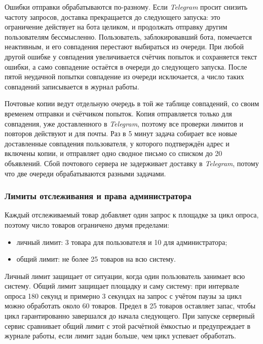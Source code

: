 Ошибки отправки обрабатываются по-разному. Если \textit{Telegram} просит снизить частоту запросов, доставка прекращается до следующего запуска: это ограничение действует на бота целиком, и продолжать отправку другим пользователям бессмысленно. Пользователь, заблокировавший бота, помечается неактивным, и его совпадения перестают выбираться из очереди. При любой другой ошибке у совпадения увеличивается счётчик попыток и сохраняется текст ошибки, а само совпадение остаётся в очереди до следующего запуска. После пятой неудачной попытки совпадение из очереди исключается, а число таких совпадений записывается в журнал работы.

Почтовые копии ведут отдельную очередь в той же таблице совпадений, со своим временем отправки и счётчиком попыток. Копия отправляется только для совпадения, уже доставленного в \textit{Telegram}, поэтому все проверки лимитов и повторов действуют и для почты. Раз в 5 минут задача собирает все новые доставленные совпадения пользователя, у которого подтверждён адрес и включены копии, и отправляет одно сводное письмо со списком до 20 объявлений. Сбой почтового сервера не задерживает доставку в \textit{Telegram}, потому что две очереди обрабатываются разными задачами.

\subsubsection{Лимиты отслеживания и права администратора}

Каждый отслеживаемый товар добавляет один запрос к площадке за цикл опроса, поэтому число товаров ограничено двумя пределами:
\begin{itemize}
	\item личный лимит: 3 товара для пользователя и 10 для администратора;
	\item общий лимит: не более 25 товаров на всю систему.
\end{itemize}

Личный лимит защищает от ситуации, когда один пользователь занимает всю систему. Общий лимит защищает площадку и саму систему: при интервале опроса 180 секунд и примерно 3 секундах на запрос с учётом паузы за цикл можно обработать около 60 товаров. Предел в 25 товаров оставляет запас, чтобы цикл гарантированно завершался до начала следующего. При запуске серверный сервис сравнивает общий лимит с этой расчётной ёмкостью и предупреждает в журнале работы, если лимит задан больше, чем цикл успевает обработать.

